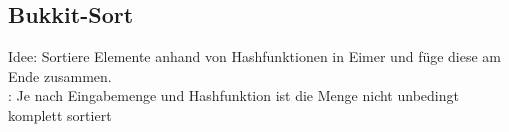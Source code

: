 \subsection{Bukkit-Sort}
Idee: Sortiere Elemente anhand von Hashfunktionen in Eimer und füge diese am Ende zusammen.
\\
: Je nach Eingabemenge und Hashfunktion ist die Menge nicht unbedingt komplett sortiert

